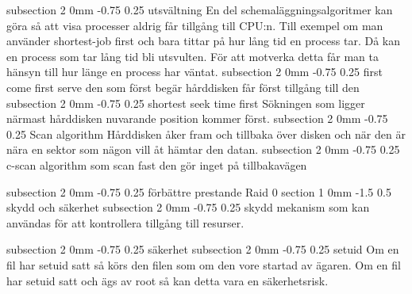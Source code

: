 \documentclass[a4paper,11pt]{article}
\makeatletter
\renewcommand{\section}{\@startsection
   {section}%
   {1}%
   {0mm}%
   {-1.5\baselineskip}%
   {0.5\baselineskip}%
   {\sffamily\bfseries\upshape\normalsize}}%
\renewcommand{\subsection}{\@startsection
   {subsection}%
   {2}%
   {0mm}%
   {-0.75\baselineskip}%
   {0.25\baselineskip}%
   {\rmfamily\normalfont\slshape\normalsize}}%
\makeatother
\begin{document}
\subsection{utsvältning}
En del schemaläggningsalgoritmer kan göra så att visa processer aldrig får tillgång till CPU:n. Till exempel om man använder shortest-job first och bara tittar på hur lång tid en process tar. Då kan en process som tar lång tid bli utsvulten. För att motverka detta får man ta hänsyn till hur länge en process har väntat.
\subsection{first come first serve}
den som först begär hårddisken får först tillgång till den
\subsection{shortest seek time first}
Sökningen som ligger närmast hårddisken nuvarande position kommer först. 
\subsection{Scan algorithm}
Hårddisken åker fram och tillbaka över disken och när den är nära en sektor som nägon  vill åt hämtar den datan. 
\subsection{c-scan algorithm}
som scan fast den gör inget på tillbakavägen

\subsection{förbättre prestande}
Raid 0
\section{skydd och säkerhet}
\subsection{skydd}
mekanism som kan användas för att kontrollera tillgång till resurser.

\subsection{säkerhet}
\subsection{setuid}
Om en fil har setuid satt så körs den filen som om den vore startad av ägaren. Om en fil har setuid satt och ägs av root så kan detta vara en säkerhetsrisk. 
\end{document}
